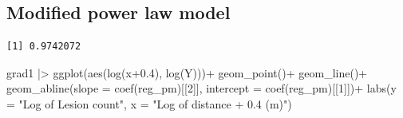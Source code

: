 \documentclass[
  letterpaper,
  DIV=11,
  numbers=noendperiod]{scrreprt}
\newenvironment{Shaded}{\begin{snugshade}}{\end{snugshade}}
\newcommand{\AttributeTok}[1]{\textcolor[rgb]{0.40,0.45,0.13}{#1}}
\newcommand{\DecValTok}[1]{\textcolor[rgb]{0.68,0.00,0.00}{#1}}
\newcommand{\FloatTok}[1]{\textcolor[rgb]{0.68,0.00,0.00}{#1}}
\newcommand{\FunctionTok}[1]{\textcolor[rgb]{0.28,0.35,0.67}{#1}}
\newcommand{\NormalTok}[1]{\textcolor[rgb]{0.00,0.23,0.31}{#1}}
\newcommand{\OtherTok}[1]{\textcolor[rgb]{0.00,0.23,0.31}{#1}}
\newcommand{\SpecialCharTok}[1]{\textcolor[rgb]{0.37,0.37,0.37}{#1}}
\newcommand{\StringTok}[1]{\textcolor[rgb]{0.13,0.47,0.30}{#1}}
\begin{document}
\hypertarget{modified-power-law-model}{%
\subsection{Modified power law model}\label{modified-power-law-model}}

\begin{Shaded}
\end{Shaded}

\begin{verbatim}
[1] 0.9742072
\end{verbatim}

\begin{Shaded}
\begin{Highlighting}[]
\NormalTok{grad1 }\SpecialCharTok{|\textgreater{}} 
  \FunctionTok{ggplot}\NormalTok{(}\FunctionTok{aes}\NormalTok{(}\FunctionTok{log}\NormalTok{(x}\FloatTok{+0.4}\NormalTok{), }\FunctionTok{log}\NormalTok{(Y)))}\SpecialCharTok{+}
  \FunctionTok{geom\_point}\NormalTok{()}\SpecialCharTok{+}
  \FunctionTok{geom\_line}\NormalTok{()}\SpecialCharTok{+}
  \FunctionTok{geom\_abline}\NormalTok{(}\AttributeTok{slope =} \FunctionTok{coef}\NormalTok{(reg\_pm)[[}\DecValTok{2}\NormalTok{]], }\AttributeTok{intercept =} \FunctionTok{coef}\NormalTok{(reg\_pm)[[}\DecValTok{1}\NormalTok{]])}\SpecialCharTok{+}
 \FunctionTok{labs}\NormalTok{(}\AttributeTok{y =} \StringTok{"Log of Lesion count"}\NormalTok{,}
       \AttributeTok{x =} \StringTok{"Log of distance + 0.4 (m)"}\NormalTok{)}
\end{Highlighting}
\end{Shaded}
\end{document}
